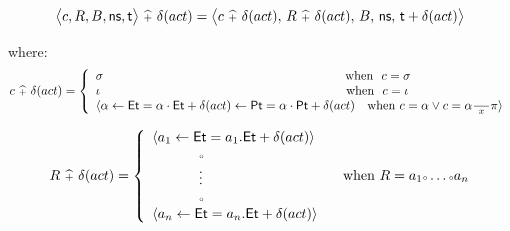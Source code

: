 \begin{displaymath}
  \big\langle c,R,B,\text{\sffamily ns},\text{\sffamily t} \big\rangle 
\ {\scriptstyle {\widehat{+}}}\  \delta (act) = 
\big\langle c \ {\scriptstyle {\widehat{+}}}\  \delta (act), \, R \ {\scriptstyle {\widehat{+}}}\  \delta (act), \,
B, \, \text{\sffamily ns}, \, \text{\sffamily t}+\delta (act)\big\rangle
\end{displaymath}

\noindent
where:
\begin{equation} 
\nonumber
  c\sqplus\delta (act) = \left \{
    \begin{array}{l}
      \sigma\qquad\qquad\qquad\qquad\qquad\qquad\qquad\quad\quad\quad\quad\quad\ \ \text{when}
      \ \ c=\sigma \\
      \iota
      \qquad\qquad\qquad\qquad\qquad\qquad\qquad\quad\quad\quad\quad\quad\ \ \ \text{when}\ \ c=\iota
      \\
      \langle\alpha\gets\SFT{Et}=\alpha\cdot\SFT{Et}+\delta (act)
      \gets\SFT{Pt}=\alpha\cdot\SFT{Pt}+\delta (act)\ \ \ \text{when}
      \  c=\alpha\vee c=\alpha\rx\pi\rangle     
    \end{array} 
    \right.
\end{equation}

\begin{equation}
\nonumber
  R\ {\scriptstyle {\widehat{+}}}\ \delta (act) = \left \{
    \begin{array}{l}
      \langle a_1\gets\text{\sffamily Et}=a_1.\text{\sffamily Et}+\delta (act) \rangle \\
      \ \ \ \ \ \ \ \ \ \ {\scriptscriptstyle \circ} \\
      \ \ \ \ \ \ \ \ \ \ \vdots \\
      \ \ \ \ \ \ \ \ \ \ {\scriptscriptstyle \circ} \\
      \langle a_n\gets\text{\sffamily Et}=a_n.\text{\sffamily Et}+\delta (act) \rangle\
    \end{array}
    \quad\text{when}\ R=a_1{\scriptscriptstyle \circ}\ldots{\scriptscriptstyle \circ} a_n
    \right.
\end{equation}



